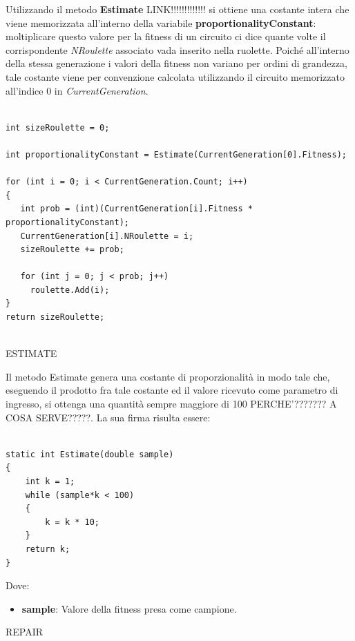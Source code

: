 \documentclass[11pt]{article}
\begin{document}
Utilizzando il metodo \textbf{Estimate} LINK!!!!!!!!!!!!! si ottiene una costante intera che viene memorizzata all'interno della variabile \textbf{proportionalityConstant}: moltiplicare questo valore per la fitness di un circuito ci dice quante volte il corrispondente \textit{NRoulette} associato vada inserito nella ruolette. Poiché all'interno della stessa generazione i valori della fitness non variano per ordini di grandezza, tale costante viene per convenzione calcolata utilizzando il circuito memorizzato all'indice $0$ in \textit{CurrentGeneration}.
\begin{lstlisting}

int sizeRoulette = 0;
            
int proportionalityConstant = Estimate(CurrentGeneration[0].Fitness);

for (int i = 0; i < CurrentGeneration.Count; i++)
{
   int prob = (int)(CurrentGeneration[i].Fitness * proportionalityConstant);
   CurrentGeneration[i].NRoulette = i;
   sizeRoulette += prob;
   
   for (int j = 0; j < prob; j++)
     roulette.Add(i);
}
return sizeRoulette;


\end{lstlisting}

\vspace{2\baselineskip}
ESTIMATE
\vspace{2\baselineskip}

Il metodo Estimate genera una costante di proporzionalità in modo tale che, eseguendo il prodotto fra tale costante ed il valore ricevuto come parametro di ingresso, si ottenga una quantità sempre maggiore di 100 PERCHE'??????? A COSA SERVE?????. La sua firma risulta essere:

\begin{lstlisting}

static int Estimate(double sample)
{
    int k = 1;
    while (sample*k < 100)
    {
        k = k * 10;
    }
    return k;
}

\end{lstlisting}

Dove:

\begin{itemize}
    \item \textbf{sample}: Valore della fitness presa come campione.
\end{itemize}

\vspace{2\baselineskip}
REPAIR
\vspace{2\baselineskip}
\end{document}
